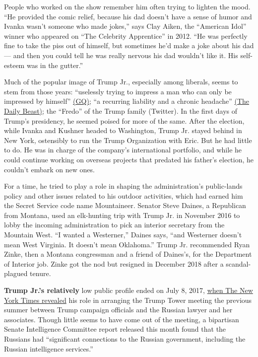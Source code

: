 People who worked on the show remember him often trying to lighten the
mood. ``He provided the comic relief, because his dad doesn't have a
sense of humor and Ivanka wasn't someone who made jokes,'' says Clay
Aiken, the ``American Idol'' winner who appeared on ``The Celebrity
Apprentice'' in 2012. ``He was perfectly fine to take the piss out of
himself, but sometimes he'd make a joke about his dad --- and then you
could tell he was really nervous his dad wouldn't like it. His
self-esteem was in the gutter.''

Much of the popular image of Trump Jr., especially among liberals, seems
to stem from those years: ``uselessly trying to impress a man who can
only be impressed by himself''
\href{https://www.gq.com/story/real-story-of-donald-trump-jr}{(GQ)}; ``a
recurring liability and a chronic headache''
\href{https://www.thedailybeast.com/trump-aides-russia-flap-proves-don-jr-is-the-fredo-of-the-first-family}{(The
Daily Beast)}; the ``Fredo'' of the Trump family (Twitter). In the first
days of Trump's presidency, he seemed poised for more of the same. After
the election, while Ivanka and Kushner headed to Washington, Trump Jr.
stayed behind in New York, ostensibly to run the Trump Organization with
Eric. But he had little to do. He was in charge of the company's
international portfolio, and while he could continue working on overseas
projects that predated his father's election, he couldn't embark on new
ones.

For a time, he tried to play a role in shaping the administration's
public-lands policy and other issues related to his outdoor activities,
which had earned him the Secret Service code name Mountaineer. Senator
Steve Daines, a Republican from Montana, used an elk-hunting trip with
Trump Jr. in November 2016 to lobby the incoming administration to pick
an interior secretary from the Mountain West. ``I wanted a Westerner,''
Daines says, ``and Westerner doesn't mean West Virginia. It doesn't mean
Oklahoma.'' Trump Jr. recommended Ryan Zinke, then a Montana congressman
and a friend of Daines's, for the Department of Interior job. Zinke got
the nod but resigned in December 2018 after a scandal-plagued tenure.

\textbf{Trump Jr.'s relatively} low public profile ended on July 8,
2017,
\href{https://www.nytimes3xbfgragh.onion/2017/07/08/us/politics/trump-russia-kushner-manafort.html}{when
The New York Times revealed} his role in arranging the Trump Tower
meeting the previous summer between Trump campaign officials and the
Russian lawyer and her associates. Though little seems to have come out
of the meeting, a bipartisan Senate Intelligence Committee report
released this month found that the Russians had ``significant
connections to the Russian government, including the Russian
intelligence services.''

